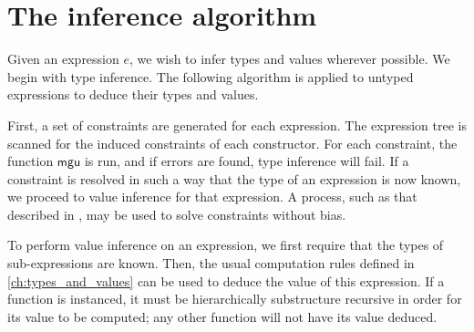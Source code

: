 \documentclass[11pt]{book}
\begin{document}
\section{The inference algorithm}

Given an expression \( e \), we wish to infer types and values wherever possible.
We begin with type inference.
The following algorithm is applied to untyped expressions to deduce their types and values.

First, a set of constraints are generated for each expression.
The expression tree is scanned for the induced constraints of each constructor.
For each constraint, the function \( \mathsf{mgu} \) is run, and if errors are found, type inference will fail.
If a constraint is resolved in such a way that the type of an expression is now known, we proceed to value inference for that expression.
A process, such as that described in \cite{Heeren02generalizinghindley-milner}, may be used to solve constraints without bias.

To perform value inference on an expression, we first require that the types of sub-expressions are known.
Then, the usual computation rules defined in \cref{ch:types_and_values} can be used to deduce the value of this expression.
If a function is instanced, it must be hierarchically substructure recursive in order for its value to be computed; any other function will not have its value deduced.



\iffalse{}

\begin{appendices}
    \appendixpage
    \noappendicestocpagenum
    \addappheadtotoc

    \chapter{Type theory formalisation reference}
    \label{ch:formalisation_reference}

    For the purposes of discussion, we present many of the rules listed in `Homotopy Type Theory' \cite{hottbook}.

    
\end{appendices}

\fi{}

\backmatter

\printbibliography
\end{document}
